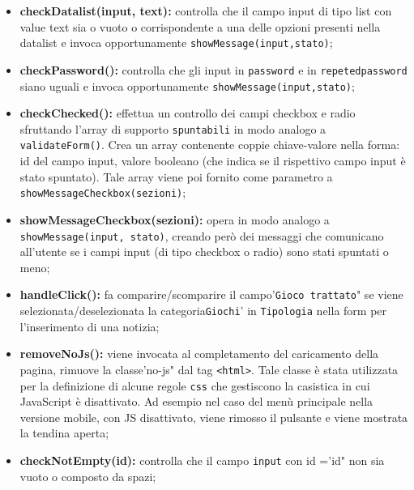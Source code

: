 \begin{itemize}
	\item \textbf{checkDatalist(input, text): } controlla che il campo input di tipo list con value text sia o vuoto o corrispondente a una delle opzioni presenti nella datalist e invoca opportunamente \texttt{showMessage(input,stato)}; \\

	\item \textbf{checkPassword(): } controlla che gli input in \texttt{password} e in \texttt{repetedpassword} siano uguali e invoca opportunamente \texttt{showMessage(input,stato)}; \\

	\item \textbf{checkChecked(): } effettua un controllo dei campi checkbox e radio sfruttando l'array di supporto \texttt{spuntabili} in modo analogo a \texttt{validateForm()}. Crea un array contenente coppie chiave-valore nella forma: id del campo input, valore booleano (che indica se il rispettivo campo input è stato spuntato). Tale array viene poi fornito come parametro a \texttt{showMessageCheckbox(sezioni)}; \\

	\item \textbf{showMessageCheckbox(sezioni): } opera in modo analogo a \texttt{showMessage(input, stato)}, creando però dei messaggi che comunicano all'utente se i campi input (di tipo checkbox o radio) sono stati spuntati o meno; \\

	\item \textbf{handleClick(): } fa comparire/scomparire il campo'\texttt{Gioco trattato}" se viene selezionata/deselezionata la categoria\texttt{Giochi}' in \texttt{Tipologia} nella form per l'inserimento di una notizia; \\

	\item \textbf{removeNoJs(): }  viene invocata al completamento del caricamento della pagina, rimuove la classe'no-js" dal tag \texttt{<html>}. Tale classe è stata utilizzata per la definizione di alcune regole \texttt{css} che gestiscono la casistica in cui JavaScript è disattivato. Ad esempio nel caso del menù principale nella versione mobile, con JS disattivato, viene rimosso il pulsante e viene mostrata la tendina aperta; \\

	\item \textbf{checkNotEmpty(id): } controlla che il campo \texttt{input} con id ='id" non sia vuoto o composto da spazi; \\


\end{itemize}
